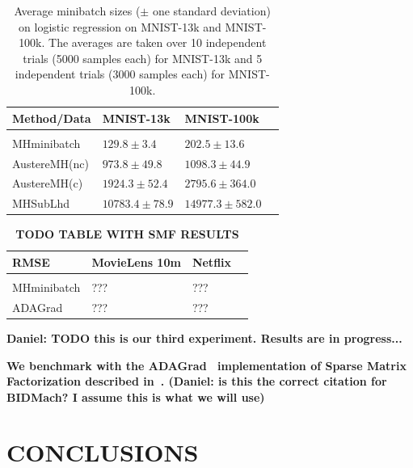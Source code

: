 \documentclass[letterpaper]{article}
\begin{document}
\begin{table}[t]
\caption{Average minibatch sizes ($\pm$ one standard deviation) on logistic
regression on MNIST-13k and MNIST-100k.  The averages are taken over 10
independent trials (5000 samples each) for MNIST-13k and 5 independent trials
(3000 samples each) for MNIST-100k.}
\small %
\label{tab:logistic}
\vskip 0.15in
\begin{center}
\begin{tabular}{l l l l}
\textbf{Method/Data} & \textbf{MNIST-13k} & \textbf{MNIST-100k}  \\
\hline \\
{\sc MHminibatch}   & $129.8\pm 3.4$    & $202.5 \pm 13.6$ \\
{\sc AustereMH(nc)} & $973.8\pm 49.8$   & $1098.3 \pm 44.9$ \\
{\sc AustereMH(c)}  & $1924.3\pm 52.4$  & $2795.6 \pm 364.0$ \\
{\sc MHSubLhd}      & $10783.4\pm 78.9$ & $14977.3 \pm 582.0$ \\
\end{tabular}
\end{center}
\vskip -0.1in
\end{table}


\begin{table}[t]
\caption{\textbf{TODO TABLE WITH SMF RESULTS}}
\small %
\label{tab:smf}
\vskip 0.15in
\begin{center}
\begin{tabular}{l l l l}
\textbf{RMSE} & \textbf{MovieLens 10m} & \textbf{Netflix}  \\
\hline \\
{\sc MHminibatch} & ??? & ??? & \\
ADAGrad           & ??? & ??? & \\
\end{tabular}
\end{center}
\vskip -0.1in
\end{table}

\textbf{Daniel: TODO this is our third experiment. Results are in progress...}

\textbf{We benchmark with the ADAGrad~\citep{adagrad} implementation of Sparse
Matrix Factorization described in~\citep{Canny:2013:BDA:2487575.2487677}.
(Daniel: is this the correct citation for BIDMach? I assume this is what we will
use)}

\section{CONCLUSIONS}\label{sec:conclusion}
\end{document}

